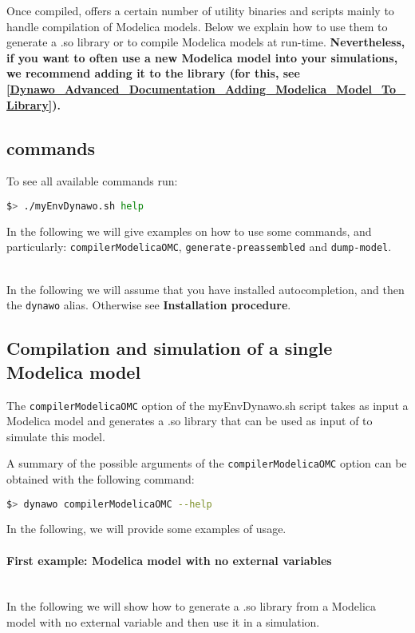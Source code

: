 \documentclass[a4paper, 12pt]{report}
\begin{document}
Once compiled, \Dynawo offers a certain number of utility binaries and scripts
mainly to handle compilation of Modelica models. Below we explain how to use
them to generate a .so library or to compile Modelica models at run-time.
\textbf{Nevertheless, if you want to often use a new Modelica model into your simulations, we recommend adding it to the \Dynawo library (for this, see \ref{Dynawo_Advanced_Documentation_Adding_Modelica_Model_To_Library}).} \\

\subsection[Dynawo commands]{\Dynawo commands}

To see all available \Dynawo commands run:
\begin{lstlisting}[language=bash,deletekeywords={jobs,help}]
$> ./myEnvDynawo.sh help
\end{lstlisting}

In the following we will give examples on how to use some commands, and particularly: \lstinline[language=bash]{compilerModelicaOMC}, \lstinline[language=bash]{generate-preassembled} and \lstinline[language=bash]{dump-model}.

~~\\
In the following we will assume that you have installed autocompletion, and then the \lstinline[language=bash]{dynawo} alias. Otherwise see \textbf{Installation procedure}.

\subsection{Compilation and simulation of a single Modelica model}

The \lstinline[language=bash]{compilerModelicaOMC} option of the myEnvDynawo.sh script takes as input a Modelica model and generates a .so library that can be used as input of \Dynawo to simulate this model.

A summary of the possible arguments of the \lstinline[language=bash]{compilerModelicaOMC} option can be obtained with the following
command:
\begin{lstlisting}[language=bash,deletekeywords={jobs,help}]
$> dynawo compilerModelicaOMC --help
\end{lstlisting}

In the following, we will provide some examples of usage.

\paragraph{First example: Modelica model with no external variables}
~~\\
In the following we will show how to generate a .so library from a
Modelica model with no external variable and then use it in a \Dynawo
simulation.
\end{document}
